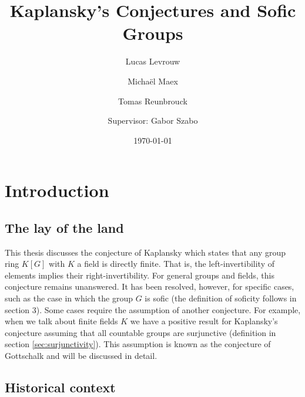 \documentclass[titlepage, a4paper]{article}
\author{Lucas Levrouw \and Michaël Maex \and Tomas Reunbrouck \and Supervisor: Gabor Szabo}
\title{Kaplansky's Conjectures and Sofic Groups}
\date{\today}
\theoremstyle{remark}
\begin{document}
    \maketitle
{}
\tableofcontents
\pagebreak

\section{Introduction}\label{sec:intro}

\subsection*{The lay of the land}

This thesis discusses the conjecture of Kaplansky which states that any group ring $K[G]$ with $K$ a field is directly finite. That is, the left-invertibility of elements implies their right-invertibility. For general groups and fields, this conjecture remains unanswered. It has been resolved, however, for specific cases, such as the case in which the group $G$ is sofic (the definition of soficity follows in section 3). Some cases require the assumption of another conjecture. For example, when we talk about finite fields $K$ we have a positive result for Kaplansky’s conjecture assuming that all countable groups are surjunctive (definition in section \ref{sec:surjunctivity}). This assumption is known as the conjecture of Gottschalk and will be discussed in detail.

\subsection*{Historical context}
\end{document}
